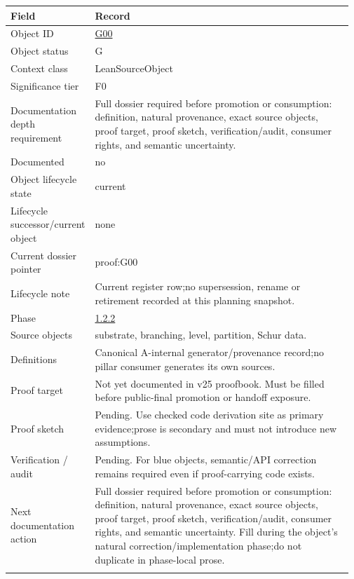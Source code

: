 \begin{longtable}{L{0.16\linewidth} L{0.81\linewidth}}
\hline
\textbf{Field} & \textbf{Record}\\
\hline
Object ID & \hyperlink{object-row-G00}{G00}\\
\hline\addlinespace[0.20em]
Object status & G\\
\hline\addlinespace[0.20em]
Context class & LeanSourceObject\\
\hline\addlinespace[0.20em]
Significance tier & F0\\
\hline\addlinespace[0.20em]
Documentation depth requirement & Full dossier required before promotion or consumption: definition, natural provenance, exact source objects, proof target, proof sketch, verification/\allowbreak{}audit, consumer rights, and semantic uncertainty.\\
\hline\addlinespace[0.20em]
Documented & no\\
\hline\addlinespace[0.20em]
Object lifecycle state & current\\
\hline\addlinespace[0.20em]
Lifecycle successor/\allowbreak{}current object & none\\
\hline\addlinespace[0.20em]
Current dossier pointer & proof:G00\\
\hline\addlinespace[0.20em]
Lifecycle note & Current register row;\newline no supersession, rename or retirement recorded at this planning snapshot.\\
\hline\addlinespace[0.20em]
Phase & \hyperlink{phase-row-1-2-2}{1.2.2}\\
\hline\addlinespace[0.20em]
Source objects & substrate, branching, level, partition, Schur data.\\
\hline\addlinespace[0.20em]
Definitions & Canonical A-internal generator/\allowbreak{}provenance record;\newline no pillar consumer generates its own sources.\\
\hline\addlinespace[0.20em]
Proof target & Not yet documented in v25 proofbook. Must be filled before public-final promotion or handoff exposure.\\
\hline\addlinespace[0.20em]
Proof sketch & Pending. Use checked code derivation site as primary evidence;\newline prose is secondary and must not introduce new assumptions.\\
\hline\addlinespace[0.20em]
Verification /\allowbreak{} audit & Pending. For blue objects, semantic/\allowbreak{}API correction remains required even if proof-carrying code exists.\\
\hline\addlinespace[0.20em]
Next documentation action & Full dossier required before promotion or consumption: definition, natural provenance, exact source objects, proof target, proof sketch, verification/\allowbreak{}audit, consumer rights, and semantic uncertainty. Fill during the object's natural correction/\allowbreak{}implementation phase;\newline do not duplicate in phase-local prose.\\
\hline\addlinespace[0.20em]
\end{longtable}
